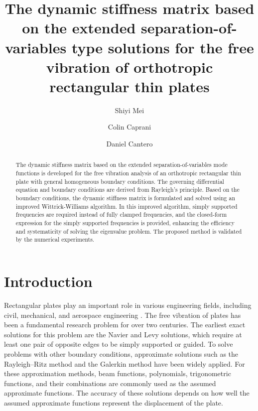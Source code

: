 \documentclass[preprint,12pt]{elsarticle}
\begin{document}
\begin{frontmatter}
\title{The dynamic stiffness matrix based on the extended separation-of-variables type solutions for the free vibration of orthotropic rectangular thin plates}
\author[1]{Shiyi Mei}
\author[1]{Colin Caprani}
\author[2]{Daniel Cantero}
\begin{abstract}
The dynamic stiffness matrix based on the extended separation-of-variables mode functions is developed for the free vibration analysis of an orthotropic rectangular thin plate with general homogeneous boundary conditions.  
The governing differential equation and boundary conditions are derived from Rayleigh’s principle.  
Based on the boundary conditions, the dynamic stiffness matrix is formulated and solved using an improved Wittrick-Williams algorithm.  
In this improved algorithm, simply supported frequencies are required instead of fully clamped frequencies, and the closed-form expression for the simply supported frequencies is provided, enhancing the efficiency and systematicity of solving the eigenvalue problem.  
The proposed method is validated by the numerical experiments.
\end{abstract}
\end{frontmatter}
\linenumbers
\section{Introduction}
Rectangular plates play an important role in various engineering fields, including civil, mechanical, and aerospace engineering \citep{biancolini2005approximate}. 
The free vibration of plates has been a fundamental research problem for over two centuries. 
The earliest exact solutions for this problem are the Navier \citep{navier1823extrait} and Levy \citep{levy1899equilibre} solutions, which require at least one pair of opposite edges to be simply supported or guided.
To solve problems with other boundary conditions, approximate solutions such as the Rayleigh–Ritz method \cite{leissa1973free} and the Galerkin method \cite{laura1967study} have been widely applied. 
For these approximation methods, beam functions, polynomials, trigonometric functions, and their combinations \cite{li2004vibration} are commonly used as the assumed approximate functions.
The accuracy of these solutions depends on how well the assumed approximate functions represent the displacement of the plate.
\end{document}
